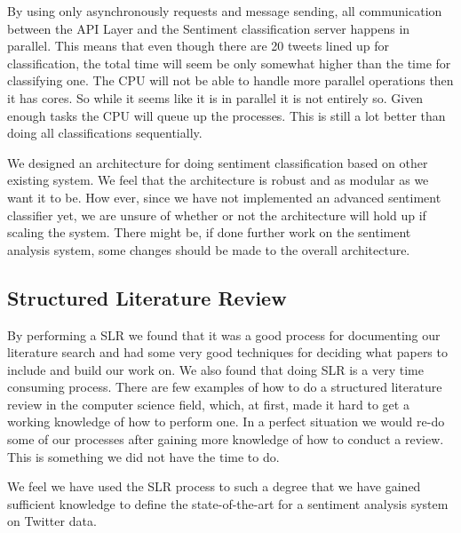 By using only asynchronously requests and message sending, all communication between the API Layer and the Sentiment classification server happens in parallel. This means that even though there are 20 tweets lined up for classification, the total time will seem be only somewhat higher than the time for classifying one. The CPU will not be able to handle more parallel operations then it has cores. So while it seems like it is in parallel it is not entirely so. Given enough tasks the CPU will queue up the processes. This is still a lot better than doing all classifications sequentially. 

We designed an architecture for doing sentiment classification based on other existing system. We feel that the architecture is robust and as modular as we want it to be. How ever, since we have not implemented an advanced sentiment classifier yet, we are unsure of whether or not the architecture will hold up if scaling the system. There might be, if done further work on the sentiment analysis system, some changes should be made to the overall architecture. 


\subsection{Structured Literature Review}

By performing a SLR we found that it was a good process for documenting our literature search and had some very good techniques for deciding what papers to include and build our work on. We also found that doing SLR is a very time consuming process. There are few examples of how to do a structured literature review in the computer science field, which, at first, made it hard to get a working knowledge of how to perform one. In a perfect situation we would re-do some of our processes after gaining more knowledge of how to conduct a review. This is something we did not have the time to do. 

We feel we have used the SLR process to such a degree that we have gained sufficient knowledge to define the state-of-the-art for a sentiment analysis system on Twitter data. 